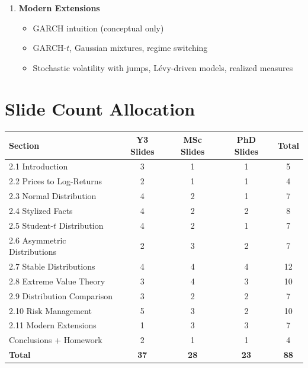 \documentclass[11pt, a4paper]{article}
\newcommand{\layerY}[1]{\textcolor{MainBlue}{\textbf{[Y3]}} #1}
\newcommand{\layerM}[1]{\textcolor{Forest}{\textbf{[MSc]}} #1}
\newcommand{\layerP}[1]{\textcolor{Purple}{\textbf{[PhD]}} #1}
\theoremstyle{definition}
\begin{document}
\begin{enumerate}[label=\textbf{2.\arabic*}, leftmargin=2cm]
\item \textbf{Modern Extensions}
  \begin{itemize}[nosep]
    \item[\layerY{}] GARCH intuition (conceptual only)
    \item[\layerM{}] GARCH-$t$, Gaussian mixtures, regime switching
    \item[\layerP{}] Stochastic volatility with jumps, Lévy-driven models, realized measures
  \end{itemize}

\end{enumerate}

\section{Slide Count Allocation}

\begin{center}
\renewcommand{\arraystretch}{1.3}
\begin{tabular}{l c c c c}
\toprule
\textbf{Section} & \textbf{Y3 Slides} & \textbf{MSc Slides} & \textbf{PhD Slides} & \textbf{Total} \\
\midrule
2.1 Introduction                  & 3  & 1  & 1  & 5  \\
2.2 Prices to Log-Returns         & 2  & 1  & 1  & 4  \\
2.3 Normal Distribution           & 4  & 2  & 1  & 7  \\
2.4 Stylized Facts                & 4  & 2  & 2  & 8  \\
2.5 Student-$t$ Distribution      & 4  & 2  & 1  & 7  \\
2.6 Asymmetric Distributions      & 2  & 3  & 2  & 7  \\
2.7 Stable Distributions          & 4  & 4  & 4  & 12 \\
2.8 Extreme Value Theory          & 3  & 4  & 3  & 10 \\
2.9 Distribution Comparison       & 3  & 2  & 2  & 7  \\
2.10 Risk Management              & 5  & 3  & 2  & 10 \\
2.11 Modern Extensions            & 1  & 3  & 3  & 7  \\
Conclusions + Homework            & 2  & 1  & 1  & 4  \\
\midrule
\textbf{Total}                    & \textbf{37} & \textbf{28} & \textbf{23} & \textbf{88} \\
\bottomrule
\end{tabular}
\end{center}
\end{document}
